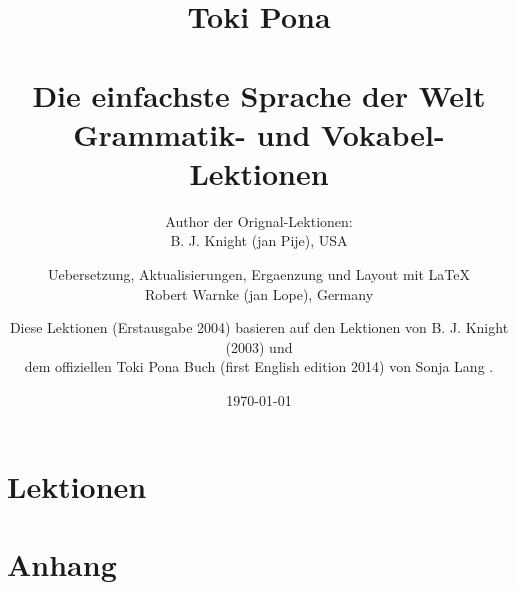 \documentclass[a4paper, 10pt]{book}
\begin{document}
\setlength{\topmargin}{-19mm}
\setlength{\headheight}{5mm}
\setlength{\headsep}{10mm}
\setlength{\textheight}{245mm}
\setlength{\textwidth}{155mm}
\setlength{\oddsidemargin}{5mm}
\setlength{\evensidemargin}{-1mm}
\setlength{\footskip}{20mm}
\setlength{\parindent}{0mm}
\setlength{\parskip}{2.0ex plus 1.0ex minus 0.5ex}
\batchmode
\title{
Toki Pona \\ \\ 
Die einfachste Sprache der Welt \\
Grammatik- und Vokabel-Lektionen \\
}
\author{
Author der Orignal-Lektionen: \\ B. J. Knight (jan Pije), USA \cite{www:Pije:01} \\  
\and
Uebersetzung, Aktualisierungen, Ergaenzung und Layout mit \LaTeX \\ Robert Warnke (jan Lope), Germany \cite{www:rowa:01} \\ 
\and
Diese Lektionen (Erstausgabe 2004) basieren auf den Lektionen von B. J. Knight (2003) und \\  
dem offiziellen Toki Pona Buch (first English edition 2014) von Sonja Lang \cite{www:tokipona.org}. 
}

%
\date
\today
\maketitle
\tableofcontents
%
\chapter{Lektionen}






















%
\appendix
\chapter{Anhang}
%
%







%


\printindex
\end{document}
